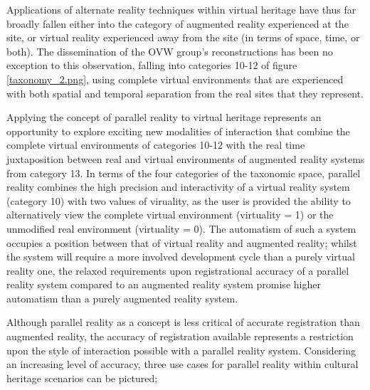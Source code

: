 \label{parallel-reality-in-virtual-heritage}

Applications of alternate reality techniques within virtual heritage have thus far broadly fallen either into the category of augmented reality experienced at the site, or virtual reality experienced away from the site (in terms of space, time, or both). The dissemination of the OVW group's reconstructions has been no exception to this observation, falling into categories 10-12 of figure \ref{taxonomy_2.png}, using complete virtual environments that are experienced with both spatial and temporal separation from the real sites that they represent.

Applying the concept of parallel reality to virtual heritage represents an opportunity to explore exciting new modalities of interaction that combine the complete virtual environments of categories 10-12 with the real time juxtaposition between real and virtual environments of augmented reality systems from category 13. In terms of the four categories of the taxonomic space, parallel reality combines the high precision and interactivity of a virtual reality system (category 10) with two values of viruality, as the user is provided the ability to alternatively view the complete virtual environment (virtuality = 1) or the unmodified real environment (virtuality = 0). The automatism of such a system occupies a position between that of virtual reality and augmented reality; whilst the system will require a more involved development cycle than a purely virtual reality one, the relaxed requirements upon registrational accuracy of a parallel reality system compared to an augmented reality system promise higher automatism than a purely augmented reality system.


Although parallel reality as a concept is less critical of accurate registration than augmented reality, the accuracy of registration available represents a restriction upon the style of interaction possible with a parallel reality system. Considering an increasing level of accuracy, three use cases for parallel reality within cultural heritage scenarios can be pictured;

